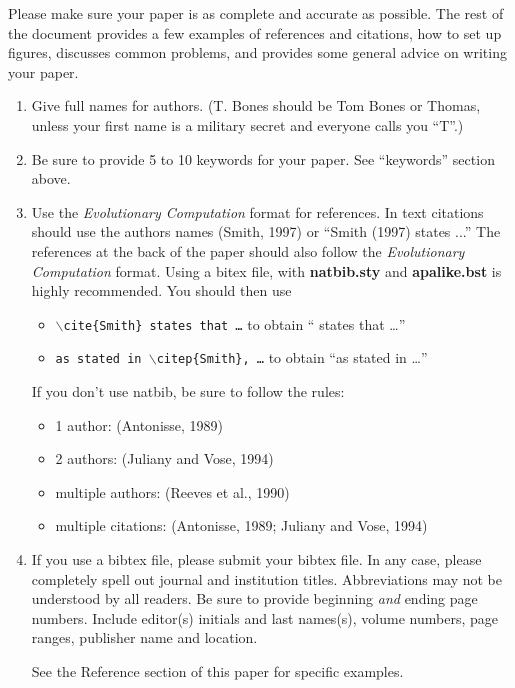 \documentclass[twoside]{article}
\begin{document}
Please make sure your paper is as complete and accurate as possible.
The rest of the document provides a few examples of references and 
citations, how to set up figures, discusses common problems, and provides some
general advice on writing your paper.

\begin{enumerate} 
    
\item
Give full names for authors.  (T. Bones should be Tom Bones or Thomas, 
unless your first name is a military secret and everyone calls you ``T''.)  

\item
Be sure to provide 5 to 10 keywords for your paper.  See ``keywords'' 
section above.

\item
Use the {\em Evolutionary Computation} format for references. In text 
citations should use the authors names (Smith, 1997) or ``Smith (1997) 
states ...''   The references at the back of the paper should also follow 
the {\em Evolutionary Computation} format. Using a bitex file, with
{\bf natbib.sty} and {\bf  apalike.bst}  is highly recommended. You
should then use 
\begin{itemize}
\item {\tt $\backslash$cite\{Smith\} states that \ldots} to obtain ``\cite{Smith} states that \ldots''
\item {\tt as stated in  $\backslash$citep\{Smith\}, \ldots} to obtain ``as stated in \citep{Smith} \ldots''
\end{itemize}

If you don't use natbib, be sure to follow the rules:

\begin{itemize}
\item 1 author: (Antonisse, 1989)
\item 2 authors: (Juliany and Vose, 1994)
\item multiple authors: (Reeves et al., 1990)
\item multiple citations: (Antonisse, 1989; Juliany and Vose, 1994) 
\end{itemize}


\item
If you use a bibtex file, please submit your bibtex file. In any case,
please completely 
spell out journal and institution titles.  Abbreviations may not be 
understood by all readers. Be sure to provide beginning {\em and} ending 
page numbers. Include editor(s) initials and last names(s), volume numbers, 
page ranges, publisher name and location.

See the Reference section of this paper for specific examples.

\end{enumerate}
\end{document}
